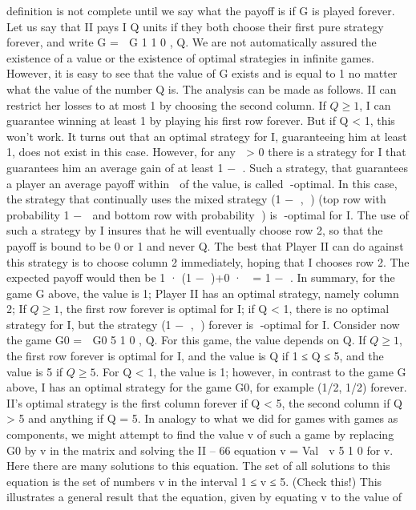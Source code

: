 \documentclass[]{report}
\begin{document}
definition is not complete until we say what the payoff is if G is played forever. Let us say
that II pays I Q units if they both choose their first pure strategy forever, and write
G =
 G 1
1 0
, Q.
We are not automatically assured the existence of a value or the existence of optimal
strategies in infinite games. However, it is easy to see that the value of G exists and is
equal to 1 no matter what the value of the number Q is. The analysis can be made as
follows.
II can restrict her losses to at most 1 by choosing the second column. If $Q \geq 1$, I can
guarantee winning at least 1 by playing his first row forever. But if Q < 1, this won’t work.
It turns out that an optimal strategy for I, guaranteeing him at least 1, does not exist in
this case. However, for any  > 0 there is a strategy for I that guarantees him an average
gain of at least 1 − . Such a strategy, that guarantees a player an average payoff within
 of the value, is called -optimal. In this case, the strategy that continually uses the
mixed strategy (1 − , ) (top row with probability 1 −  and bottom row with probability
) is -optimal for I. The use of such a strategy by I insures that he will eventually choose
row 2, so that the payoff is bound to be 0 or 1 and never Q. The best that Player II can
do against this strategy is to choose column 2 immediately, hoping that I chooses row 2.
The expected payoff would then be 1 · (1 − )+0 ·  = 1 − .
In summary, for the game G above, the value is 1; Player II has an optimal strategy,
namely column 2; If $Q \geq 1$, the first row forever is optimal for I; if Q < 1, there is no
optimal strategy for I, but the strategy (1 − , ) forever is -optimal for I.
Consider now the game
G0 =
 G0 5
1 0
, Q.
For this game, the value depends on Q. If $Q \geq 1$, the first row forever is optimal for I,
and the value is Q if 1 ≤ Q ≤ 5, and the value is 5 if $Q \geq 5$. For Q < 1, the value is 1;
however, in contrast to the game G above, I has an optimal strategy for the game G0, for
example (1/2, 1/2) forever. II’s optimal strategy is the first column forever if Q < 5, the
second column if Q > 5 and anything if Q = 5.
In analogy to what we did for games with games as components, we might attempt
to find the value v of such a game by replacing G0 by v in the matrix and solving the
II – 66
equation
v = Val  v 5
1 0
for v. Here there are many solutions to this equation. The set of all solutions to this
equation is the set of numbers v in the interval 1 ≤ v ≤ 5. (Check this!)
This illustrates a general result that the equation, given by equating v to the value of
\end{document}
